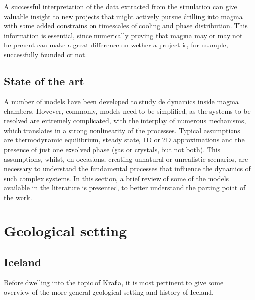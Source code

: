 A successful interpretation of the data extracted from the simulation can give valuable insight to new projects that might actively pursue drilling into magma with some added constrains on timescales of cooling and phase distribution. This information is essential, since numerically proving that magma may or may not be present can make a great difference on wether a project is, for example, successfully founded or not.

\subsection{State of the art}
A number of models have been developed to study de dynamics inside magma chambers. However, commonly, models need to be simplified, as the systems to be resolved are extremely complicated, with the interplay of numerous mechanisms, which translates in a strong nonlinearity of the processes. Typical assumptions are thermodynamic equilibrium, steady state, 1D or 2D approximations and the presence of just one exsolved phase (gas or crystals, but not both). This assumptions, whilst, on occasions, creating unnatural or unrealistic scenarios, are necessary to understand the fundamental processes that influence the dynamics of such complex systems. 
In this section, a brief review of some of the models available in the literature is presented, to better understand the parting point of the work. 


\section{Geological setting}\label{sec:i}
\subsection{Iceland}
Before dwelling into the topic of Krafla, it is most pertinent to give some overview of the more general geological setting and history of Iceland. 

